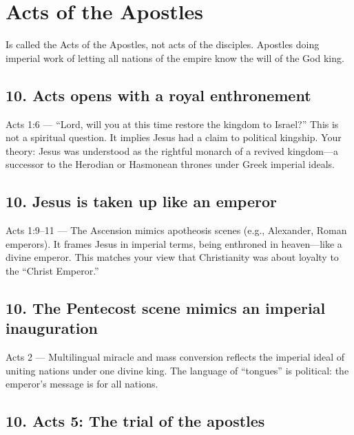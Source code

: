 \section{Acts of the Apostles}\label{subsec:acts-of-the-apostles}

Is called the Acts of the Apostles, not acts of the disciples.
Apostles doing imperial work of letting all nations of the empire know the will of the God king.

\subsection{10.
Acts opens with a royal enthronement}\label{subsec:acts-opens-with-a-royal-enthronement}

Acts 1:6 --- ``Lord, will you at this time restore the kingdom to Israel?'' This is not a spiritual question.
It implies Jesus had a claim to political kingship.
Your theory: Jesus was understood as the rightful monarch of a revived kingdom---a successor to the Herodian or Hasmonean thrones under Greek imperial ideals.

\subsection{10.
Jesus is taken up like an emperor}\label{subsec:jesus-is-taken-up-like-an-emperor}

Acts 1:9--11 --- The Ascension mimics apotheosis scenes (e.g., Alexander, Roman emperors).
It frames Jesus in imperial terms, being enthroned in heaven---like a divine emperor.
This matches your view that Christianity was about loyalty to the ``Christ Emperor.''

\subsection{10.
The Pentecost scene mimics an imperial inauguration}\label{subsec:the-pentecost-scene-mimics-an-imperial-inauguration}

Acts 2 --- Multilingual miracle and mass conversion reflects the imperial ideal of uniting nations under one divine king.
The language of ``tongues'' is political: the emperor's message is for all nations.

\subsection{10.
Acts 5: The trial of the apostles}\label{subsec:acts-5-the-trial-of-the-apostles}

